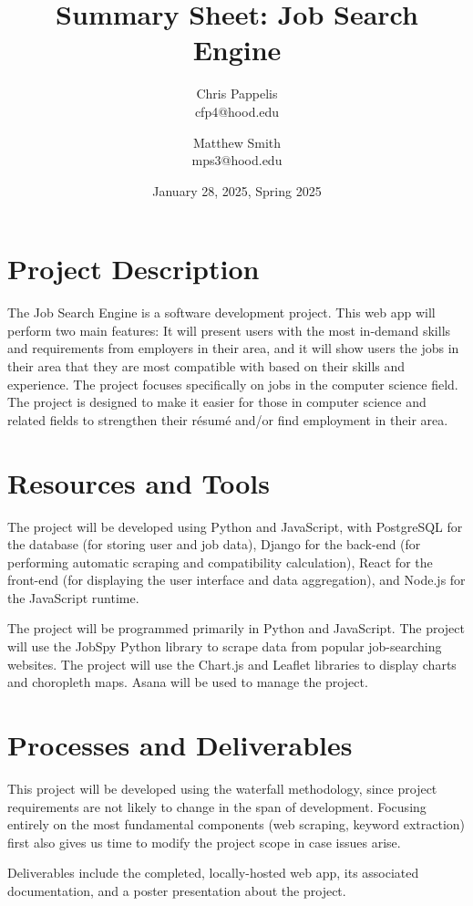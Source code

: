 \documentclass{article}
\title{Summary Sheet: Job Search Engine}
\author{
  Chris Pappelis\\
  cfp4@hood.edu
  \and
  Matthew Smith\\
  mps3@hood.edu
}
\date{January 28, 2025, Spring 2025}
\begin{document}
\maketitle

\section{Project Description}
The Job Search Engine is a software development project. This web app will perform two main features: It will present users with the most in-demand skills and requirements from employers in their area, and it will show users the jobs in their area that they are most compatible with based on their skills and experience. The project focuses specifically on jobs in the computer science field. The project is designed to make it easier for those in computer science and related fields to strengthen their r\'esum\'e and/or find employment in their area.

\section{Resources and Tools}
The project will be developed using Python and JavaScript, with PostgreSQL for the database (for storing user and job data), Django for the back-end (for performing automatic scraping and compatibility calculation), React for the front-end (for displaying the user interface and data aggregation), and Node.js for the JavaScript runtime. 

The project will be programmed primarily in Python and JavaScript. The project will use the JobSpy Python library to scrape data from popular job-searching websites. The project will use the Chart.js and Leaflet libraries to display charts and choropleth maps. Asana will be used to manage the project.


\section{Processes and Deliverables}
This project will be developed using the waterfall methodology, since project requirements are not likely to change in the span of development. Focusing entirely on the most fundamental components (web scraping, keyword extraction) first also gives us time to modify the project scope in case issues arise.

Deliverables include the completed, locally-hosted web app, its associated documentation, and a poster presentation about the project.
\end{document}
